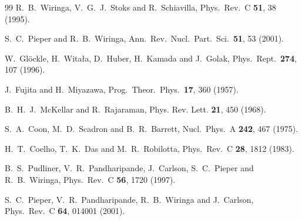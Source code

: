 \documentclass[aps,rmp,nofootinbib,twocolumn,floatfix]{revtex4}
\begin{document}
\begin{thebibliography}{99}
  R.~B.~Wiringa, V.~G.~J.~Stoks and R.~Schiavilla,
  Phys.\ Rev.\  C {\bf 51}, 38 (1995).

  S.~C.~Pieper and R.~B.~Wiringa,
  Ann.\ Rev.\ Nucl.\ Part.\ Sci.\  {\bf 51}, 53 (2001).

  W.~Gl\"ockle, H.~Wita{\l}a, D.~Huber, H.~Kamada and J.~Golak,
  Phys.\ Rept.\  {\bf 274}, 107 (1996).

  J.~Fujita and H.~Miyazawa,
  Prog.\ Theor.\ Phys.\  {\bf 17}, 360 (1957).

B.~H.~J.~McKellar and R.~Rajaraman,
Phys. Rev. Lett. {\bf 21}, 450 (1968).

  S.~A.~Coon, M.~D.~Scadron and B.~R.~Barrett,
  Nucl.\ Phys.\  A {\bf 242}, 467 (1975).

  H.~T.~Coelho, T.~K.~Das and M.~R.~Robilotta,
  Phys.\ Rev.\  C {\bf 28}, 1812 (1983).

  B.~S.~Pudliner, V.~R.~Pandharipande, J.~Carlson, S.~C.~Pieper and R.~B.~Wiringa,
  Phys.\ Rev.\  C {\bf 56}, 1720 (1997).

  S.~C.~Pieper, V.~R.~Pandharipande, R.~B.~Wiringa and J.~Carlson,
  Phys.\ Rev.\  C {\bf 64}, 014001 (2001).



\end{thebibliography}
\end{document}
